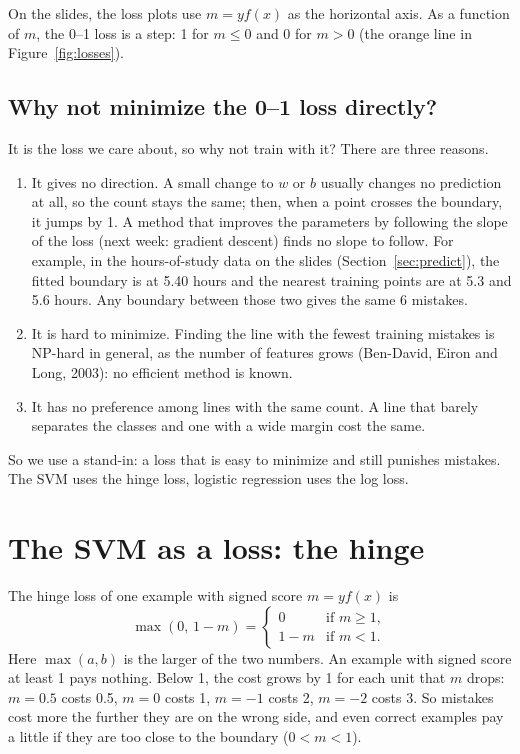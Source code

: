 \documentclass[11pt]{article}
\begin{document}
On the slides, the loss plots use $m = y f(x)$ as the horizontal axis. As a function of $m$, the 0--1
loss is a step: 1 for $m \le 0$ and 0 for $m > 0$ (the orange line in Figure~\ref{fig:losses}).

\subsection{Why not minimize the 0--1 loss directly?}

It is the loss we care about, so why not train with it? There are three reasons.

\begin{enumerate}
  \item It gives no direction. A small change to $w$ or $b$ usually changes no prediction at all, so
        the count stays the same; then, when a point crosses the boundary, it jumps by 1. A method
        that improves the parameters by following the slope of the loss (next week: gradient
        descent) finds no slope to follow. For example, in the hours-of-study data on the slides
        (Section~\ref{sec:predict}), the fitted boundary is at 5.40 hours and the nearest training
        points are at 5.3 and 5.6 hours. Any boundary between those two gives the same 6 mistakes.
  \item It is hard to minimize. Finding the line with the fewest training mistakes is NP-hard in
        general, as the number of features grows (Ben-David, Eiron and Long, 2003): no efficient
        method is known.
  \item It has no preference among lines with the same count. A line that barely separates the
        classes and one with a wide margin cost the same.
\end{enumerate}

So we use a stand-in: a loss that is easy to minimize and still punishes mistakes. The SVM uses the
hinge loss, logistic regression uses the log loss.

\section{The SVM as a loss: the hinge}\label{sec:hinge}

The hinge loss of one example with signed score $m = y f(x)$ is
\[
  \max(0,\, 1 - m) =
  \begin{cases}
    0     & \text{if } m \ge 1, \\
    1 - m & \text{if } m < 1 .
  \end{cases}
\]
Here $\max(a, b)$ is the larger of the two numbers. An example with signed score at least 1 pays
nothing. Below 1, the cost grows by 1 for each unit that $m$ drops: $m = 0.5$ costs 0.5, $m = 0$ costs 1,
$m = -1$ costs 2, $m = -2$ costs 3. So mistakes cost more the further they are on the wrong side,
and even correct examples pay a little if they are too close to the boundary ($0 < m < 1$).
\end{document}
